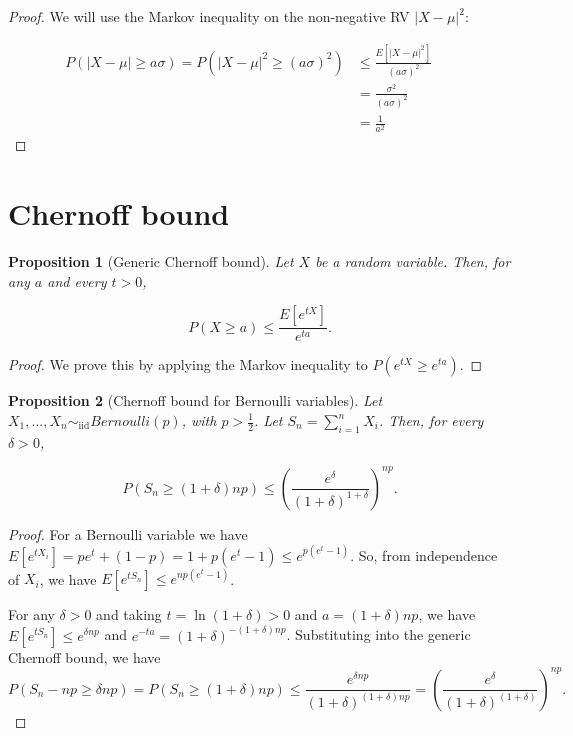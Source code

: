 \documentclass{book}
\theoremstyle{plain}%
\newtheorem{proposition}{Proposition}[section]
\theoremstyle{definition}
\begin{document}
\begin{proof}
We will use the Markov inequality on the non-negative RV $|X-\mu|^2$:

\begin{align*}
    P(|X-\mu| \geq a\sigma) = P(|X-\mu|^2 \geq (a\sigma)^2) &\leq  \frac{E[|X-\mu|^2]}{(a\sigma)^2}\\
    &= \frac{\sigma^2}{(a\sigma)^2} && \\
    &= \frac{1}{a^2}
\end{align*}

\end{proof}

\section{Chernoff bound}

\begin{proposition}[Generic Chernoff bound]
Let $X$ be a random variable. Then, for any $a$ and every $t > 0$,

$$P(X \geq a) \leq \frac{E[e^{tX}]}{e^{ta}}.$$
\end{proposition}

\begin{proof}
We prove this by applying the Markov inequality to $P(e^{tX} \geq e^{ta})$.
\end{proof}

\begin{proposition}[Chernoff bound for Bernoulli variables]
Let $X_1,...,X_n \sim_\text{iid} Bernoulli(p)$, with $p > \frac{1}{2}$. Let $S_n = \sum_{i=1}^n X_i$. Then, for every $\delta > 0$,

$$P(S_n \geq (1 + \delta)np) \leq \left(\frac{e^\delta}{(1 + \delta)^{1+\delta}}\right)^{np}.$$
\end{proposition}

\begin{proof}
For a Bernoulli variable we have $E[e^{tX_i}] = pe^t + (1-p) = 1 + p(e^t - 1) \leq e^{p(e^t-1)}$. So, from independence of $X_i$, we have $E[e^{tS_n}] \leq e^{np(e^t-1)}$.

For any $\delta > 0$ and taking $t = \ln(1 + \delta) > 0$ and $a = (1+\delta)np$, we have $E[e^{tS_n}] \leq e^{\delta np}$ and $e^{-ta} = (1 + \delta)^{-(1+\delta)np}$. Substituting into the generic Chernoff bound, we have
$$P(S_n - np \geq \delta np) = P(S_n \geq (1 + \delta)np) \leq \frac{e^{\delta np}}{(1 + \delta)^{(1+\delta)np}} = \left(\frac{e^\delta}{(1 + \delta)^{(1+\delta)}}\right)^{np}.$$
\end{proof}
\end{document}
